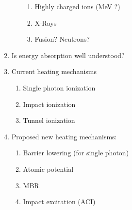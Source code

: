 \begin{enumerate}
\begin{enumerate}
\begin{enumerate}
            \item Highly charged ions (MeV ?)
            \item X-Rays
            \item Fusion? Neutrons?
        \end{enumerate}
    \end{enumerate}
\item Is energy absorption well understood?
\item Current heating mechanisms
    \begin{enumerate}
    \item Single photon ionization
    \item Impact ionization
    \item Tunnel ionization
    \end{enumerate}
\item Proposed new heating mechanisms:
    \begin{enumerate}
    \item Barrier lowering (for single photon)
    \item Atomic potential
    \item MBR
    \item Impact excitation (ACI)
    \end{enumerate}
\end{enumerate}






